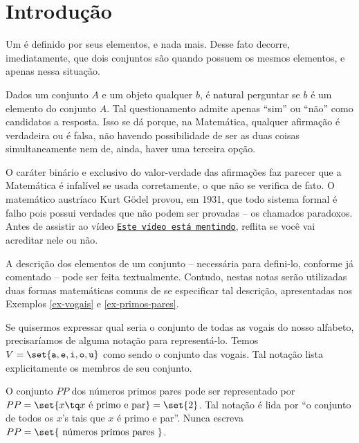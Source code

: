 \section{Introdução}
\label{sec:intro}

Um  é definido por seus elementos, e nada mais.
Desse fato decorre, imediatamente, que dois conjuntos são  quando possuem os mesmos elementos, e apenas nessa situação. 

Dados um conjunto $A$ e um objeto qualquer $b$, é natural perguntar se $b$ é um elemento do conjunto $A$.
Tal questionamento admite apenas ``sim'' ou ``não'' como candidatos a resposta.
Isso se dá porque, na Matemática, qualquer afirmação é verdadeira ou é falsa, não havendo possibilidade de ser as duas coisas simultaneamente nem de, ainda, haver uma terceira opção. 

{
O caráter binário e exclusivo do valor-verdade das afirmações faz parecer que a Matemática é infalível se usada corretamente, o que não se verifica de fato.
O matemático austríaco Kurt Gödel provou, em 1931, que todo sistema formal é falho pois possui verdades que não podem ser provadas -- os chamados paradoxos.
Antes de assistir ao vídeo \href{https://youtu.be/UI1xR_AECrU}{{\tt Este vídeo está mentindo}}, reflita se você vai acreditar nele ou não.
}


A descrição dos elementos de um conjunto -- necessária para defini-lo, conforme já comentado -- pode ser feita textualmente.
Contudo, nestas notas serão utilizadas duas formas matemáticas comuns de se especificar tal descrição, apresentadas nos Exemplos \ref{ex-vogais} e \ref{ex-primos-pares}. 

\begin{example}
\label{ex-vogais}
Se quisermos expressar qual seria o conjunto de todas as vogais do nosso alfabeto, precisaríamos de alguma notação para representá-lo. 
Temos $V=\set{\texttt{a}, \texttt{e}, \texttt{i}, \texttt{o}, \texttt{u}}$ como sendo o conjunto das vogais. Tal notação lista explicitamente os membros de seu conjunto.
\end{example}

\begin{example}
\label{ex-primos-pares}
O conjunto $PP$ dos números primos pares pode ser representado por $PP = \set{x \tq x \text{ é primo e par}} = \set{2}$.
Tal notação é lida por ``o conjunto de todos os $x$'s tais que $x$ é primo e par''.
Nunca escreva $PP = \set{\text{ números primos pares }}$.
\end{example}

%
